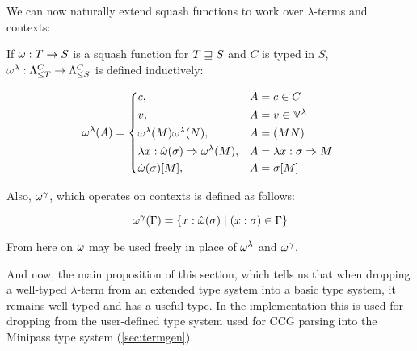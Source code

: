 \documentclass[main.tex]{subfiles}
\begin{document}
We can now naturally extend squash functions to work over $\lambda$-terms
and contexts:
\begin{defn}
    If $\squash: T \fun S$ is a squash function for $T \tless S$ and
    $C$ is typed in $S$,
    $\lsquash: \fancylambda{T}{C} \fun \fancylambda{S}{C}$
    is defined inductively:

    \[
        \lsquash(A) =
        \begin{cases*}
            c ,& $A = c \in C$ \\
            v ,& $A = v \in \lvars$ \\
            \lsquash(M) \lsquash(N) ,& $A = (MN)$ \\
            \lambda x : \tsquash(\sigma) \abstr \lsquash(M)
 ,& $A = \lambda x : \sigma \abstr M$ \\
                \tsquash(\sigma)[M] ,& $A = \sigma[M]$ \\
        \end{cases*}
    \]

    Also,
    $\consquash$, which operates on contexts
    is defined as follows:

    \[
        \consquash(\Gamma)
            = \{ x : \tsquash(\sigma) \mid (x : \sigma) \in \Gamma \}
    \]
\end{defn}

From here on $\squash$ may be used freely in place of $\lsquash$
and $\consquash$.

And now, the main proposition of this section, which tells us that when
dropping a well-typed $\lambda$-term from an extended type system into
a basic type system, it remains well-typed and has a useful type.
In the implementation this is used for dropping from the user-defined
type system used for CCG parsing into the Minipass type system
(\cref{sec:termgen}).
\end{document}
